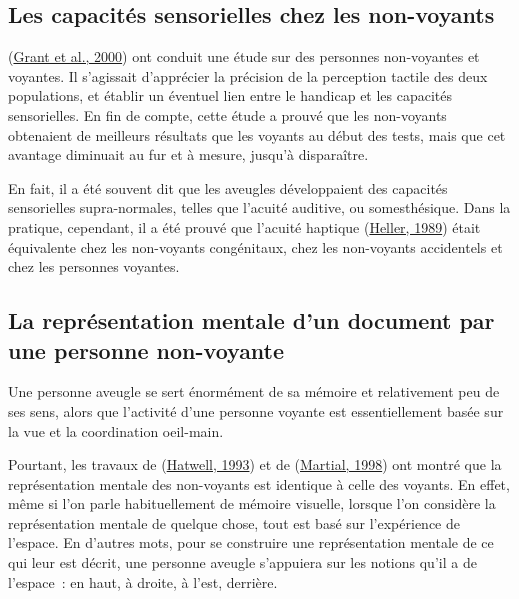 \documentclass[
]{book}
\begin{document}
\hypertarget{les-capacituxe9s-sensorielles-chez-les-non-voyants}{%
\subsection{Les capacités sensorielles chez les non-voyants}\label{les-capacituxe9s-sensorielles-chez-les-non-voyants}}

(\protect\hyperlink{ref-grant2000tactile}{Grant et al., 2000}) ont conduit
une étude sur des personnes non-voyantes et voyantes. Il s'agissait
d'apprécier la précision de la perception tactile des deux populations, et
établir un éventuel lien entre le handicap et les capacités sensorielles. En
fin de compte, cette étude a prouvé que les non-voyants obtenaient de
meilleurs résultats que les voyants au début des tests, mais que cet avantage
diminuait au fur et à mesure, jusqu'à disparaître.

En fait, il a été souvent dit que les aveugles développaient des capacités
sensorielles supra-normales, telles que l'acuité auditive, ou somesthésique.
Dans la pratique, cependant, il a été prouvé que l'acuité haptique
(\protect\hyperlink{ref-heller1989texture}{Heller, 1989}) était équivalente chez les
non-voyants congénitaux, chez les non-voyants accidentels et chez les
personnes voyantes.

\hypertarget{la-repruxe9sentation-mentale-dun-document-par-une-personne-non-voyante}{%
\subsection{La représentation mentale d'un document par une personne non-voyante}\label{la-repruxe9sentation-mentale-dun-document-par-une-personne-non-voyante}}

Une personne aveugle se sert énormément de sa mémoire et relativement peu
de ses sens, alors que l'activité d'une personne voyante est essentiellement
basée sur la vue et la coordination oeil-main.

Pourtant, les travaux de (\protect\hyperlink{ref-hatwell1993images}{Hatwell, 1993}) et de (\protect\hyperlink{ref-martial1998representation}{Martial, 1998})
ont montré que la représentation mentale des non-voyants est identique à celle
des voyants. En effet, même si l'on parle habituellement de mémoire visuelle,
lorsque l'on considère la représentation mentale de quelque chose, tout est
basé sur l'expérience de l'espace. En d'autres mots, pour se construire une
représentation mentale de ce qui leur est décrit, une personne aveugle
s'appuiera sur les notions qu'il a de l'espace~: en haut, à droite, à l'est,
derrière.
\end{document}
